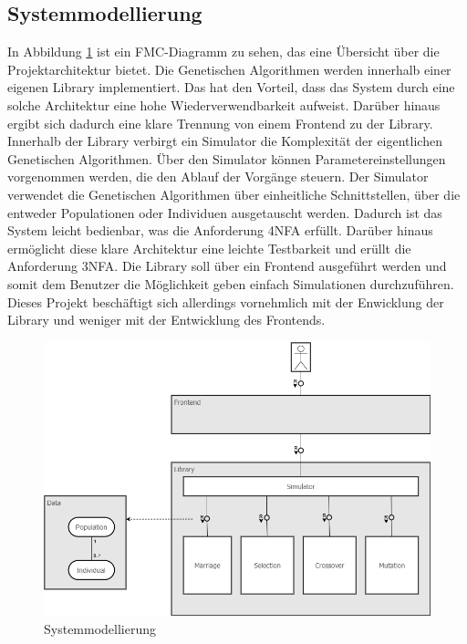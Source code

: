 \subsection{Systemmodellierung}

In Abbildung \ref{fig:systemmodellierung} ist ein FMC-Diagramm zu sehen, das eine Übersicht über die Projektarchitektur bietet.
Die Genetischen Algorithmen werden innerhalb einer eigenen Library implementiert. Das hat den Vorteil, dass das System durch eine solche Architektur eine hohe Wiederverwendbarkeit aufweist. Darüber hinaus ergibt sich dadurch eine klare Trennung von einem Frontend zu der Library.
Innerhalb der Library verbirgt ein Simulator die Komplexität der eigentlichen Genetischen Algorithmen. Über den Simulator können Parametereinstellungen vorgenommen werden, die den Ablauf der Vorgänge steuern.
Der Simulator verwendet die Genetischen Algorithmen über einheitliche Schnittstellen, über die entweder Populationen oder Individuen ausgetauscht werden. Dadurch ist das System leicht bedienbar, was die Anforderung 4NFA erfüllt. Darüber hinaus ermöglicht diese klare Architektur eine leichte Testbarkeit und erüllt die Anforderung 3NFA. Die Library soll über ein Frontend ausgeführt werden und somit dem Benutzer die Möglichkeit geben einfach Simulationen durchzuführen. Dieses Projekt beschäftigt sich allerdings vornehmlich mit der Enwicklung der Library und weniger mit der Entwicklung des Frontends.

\begin{figure}[H]
\centering
\includegraphics[width=1\textwidth]{img/Vortrag/Systemmodellierung.png}
\caption{Systemmodellierung}
\label{fig:systemmodellierung}
\end{figure}

